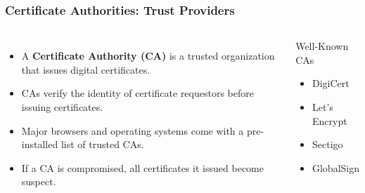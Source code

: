 \documentclass{beamer}
\begin{document}
\begin{frame}
    \frametitle{Certificate Authorities: Trust Providers}
    
    \begin{columns}[t]
            \begin{itemize}
                \item A \textbf{Certificate Authority (CA)} is a trusted organization that issues digital certificates.
                
                \item CAs verify the identity of certificate requestors before issuing certificates.
                
                \item Major browsers and operating systems come with a pre-installed list of trusted CAs.
                
                \item If a CA is compromised, all certificates it issued become suspect.
            \end{itemize}
            
            \begin{alertblock}{Well-Known CAs}
                \begin{itemize}
                    \item DigiCert
                    \item Let's Encrypt
                    \item Sectigo
                    \item GlobalSign
                \end{itemize}
            \end{alertblock}
    \end{columns}
\end{frame}
\end{document}
